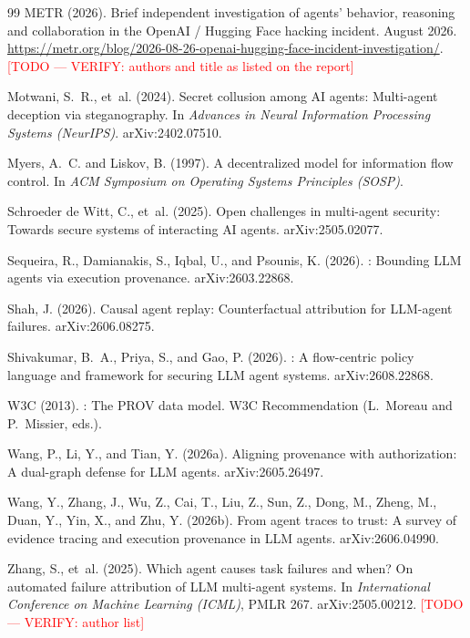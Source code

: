 \documentclass[11pt, a4paper]{article}
\newcommand{\todo}[1]{\textcolor{red}{[TODO --- #1]}}
\theoremstyle{definition}
\begin{document}
\begin{thebibliography}{99}
METR (2026).
\newblock Brief independent investigation of agents' behavior, reasoning and collaboration in the {OpenAI} / {Hugging Face} hacking incident.
 August 2026. \url{https://metr.org/blog/2026-08-26-openai-hugging-face-incident-investigation/}. \todo{VERIFY: authors and title as listed on the report}

Motwani, S.~R., et~al. (2024).
\newblock Secret collusion among {AI} agents: Multi-agent deception via steganography.
\newblock In \emph{Advances in Neural Information Processing Systems (NeurIPS)}. arXiv:2402.07510.

Myers, A.~C. and Liskov, B. (1997).
\newblock A decentralized model for information flow control.
\newblock In \emph{ACM Symposium on Operating Systems Principles (SOSP)}.

Schroeder de Witt, C., et~al. (2025).
\newblock Open challenges in multi-agent security: Towards secure systems of interacting {AI} agents.
\newblock arXiv:2505.02077.

Sequeira, R., Damianakis, S., Iqbal, U., and Psounis, K. (2026).
: Bounding {LLM} agents via execution provenance.
\newblock arXiv:2603.22868.

Shah, J. (2026).
\newblock Causal agent replay: Counterfactual attribution for {LLM}-agent failures.
\newblock arXiv:2606.08275.

Shivakumar, B.~A., Priya, S., and Gao, P. (2026).
: A flow-centric policy language and framework for securing {LLM} agent systems.
\newblock arXiv:2608.22868.

W3C (2013).
: The {PROV} data model.
\newblock W3C Recommendation (L.~Moreau and P.~Missier, eds.).

Wang, P., Li, Y., and Tian, Y. (2026a).
\newblock Aligning provenance with authorization: A dual-graph defense for {LLM} agents.
\newblock arXiv:2605.26497.

Wang, Y., Zhang, J., Wu, Z., Cai, T., Liu, Z., Sun, Z., Dong, M., Zheng, M., Duan, Y., Yin, X., and Zhu, Y. (2026b).
\newblock From agent traces to trust: A survey of evidence tracing and execution provenance in {LLM} agents.
\newblock arXiv:2606.04990.

Zhang, S., et~al. (2025).
\newblock Which agent causes task failures and when? {On} automated failure attribution of {LLM} multi-agent systems.
\newblock In \emph{International Conference on Machine Learning (ICML)}, PMLR 267. arXiv:2505.00212. \todo{VERIFY: author list}

\end{thebibliography}
\end{document}
